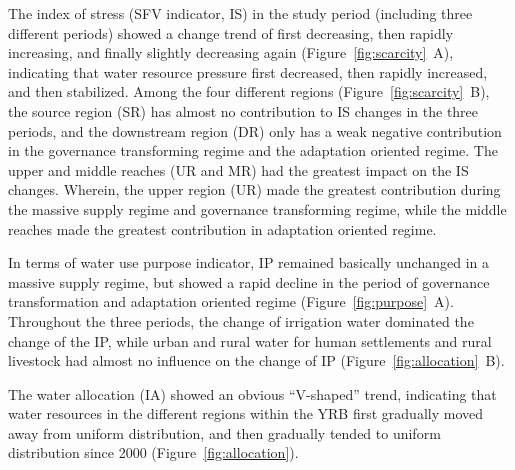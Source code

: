 \documentclass[draft,wrr]{../agutexSI2019}
\begin{document}
\begin{article}
The index of stress (SFV indicator, IS) in the study period (including three different periods) showed a change trend of first decreasing, then rapidly increasing, and finally slightly decreasing again (Figure~\ref{fig:scarcity}~A), indicating that water resource pressure first decreased, then rapidly increased, and then stabilized.
Among the four different regions (Figure~\ref{fig:scarcity}~B), the source region (SR) has almost no contribution to IS changes in the three periods, and the downstream region (DR) only has a weak negative contribution in the governance transforming regime and the adaptation oriented regime.
The upper and middle reaches (UR and MR) had the greatest impact on the IS changes. Wherein, the upper region (UR) made the greatest contribution during the massive supply regime and governance transforming regime, while the middle reaches made the greatest contribution in adaptation oriented regime.


In terms of water use purpose indicator, IP remained basically unchanged in a massive supply regime, but showed a rapid decline in the period of governance transformation and adaptation oriented regime (Figure~\ref{fig:purpose}~A).
Throughout the three periods, the change of irrigation water dominated the change of the IP, while urban and rural water for human settlements and rural livestock had almost no influence on the change of IP (Figure~\ref{fig:allocation}~B).

The water allocation (IA) showed an obvious ``V-shaped'' trend, indicating that water resources in the different regions within the YRB first gradually moved away from uniform distribution, and then gradually tended to uniform distribution since 2000 (Figure~\ref{fig:allocation}).



\end{article}
\end{document}
